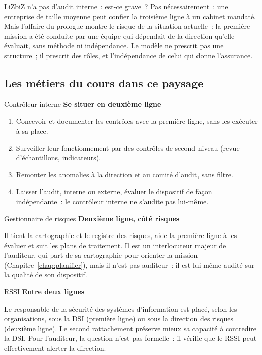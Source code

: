 \begin{boiteRemarque}{LiZbiZ n'a pas d'audit interne~: est-ce grave~?}
Pas nécessairement~: une entreprise de taille moyenne peut confier la
troisième ligne à un cabinet mandaté. Mais l'affaire du prologue montre le
risque de la situation actuelle~: la première mission a été conduite par
une équipe qui dépendait de la direction qu'elle évaluait, sans méthode ni
indépendance. Le modèle ne prescrit pas une structure~; il prescrit des
rôles, et l'indépendance de celui qui donne l'assurance.
\end{boiteRemarque}

\subsection{Les métiers du cours dans ce paysage}

\begin{boxmetier}{Contrôleur interne}
\textbf{Se situer en deuxième ligne}
\begin{enumerate}
    \item Concevoir et documenter les contrôles avec la première ligne,
          sans les exécuter à sa place.
    \item Surveiller leur fonctionnement par des contrôles de second niveau
          (revue d'échantillons, indicateurs).
    \item Remonter les anomalies à la direction et au comité d'audit, sans
          filtre.
    \item Laisser l'audit, interne ou externe, évaluer le dispositif de façon
          indépendante~: le contrôleur interne ne s'audite pas lui-même.
\end{enumerate}
\end{boxmetier}

\begin{boxmetier}{Gestionnaire de risques}
\textbf{Deuxième ligne, côté risques}

Il tient la cartographie et le registre des risques, aide la première ligne
à les évaluer et suit les plans de traitement. Il est un interlocuteur
majeur de l'auditeur, qui part de sa cartographie pour orienter la
mission (Chapitre~\ref{chap:planifier}), mais il n'est pas auditeur~: il
est lui-même audité sur la qualité de son dispositif.
\end{boxmetier}

\begin{boxmetier}{RSSI}
\textbf{Entre deux lignes}

Le responsable de la sécurité des systèmes d'information est placé, selon
les organisations, sous la DSI (première ligne) ou sous la direction des
risques (deuxième ligne). Le second rattachement préserve mieux sa capacité
à contredire la DSI. Pour l'auditeur, la question n'est pas formelle~: il
vérifie que le RSSI peut effectivement alerter la direction.
\end{boxmetier}

